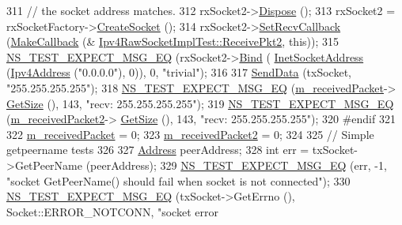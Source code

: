 \begin{DoxyCode}
311   \textcolor{comment}{// the socket address matches.}
312   rxSocket2->\hyperlink{classns3_1_1Object_aa90ae598863f6c251cdab3c3722afdaf}{Dispose} ();
313   rxSocket2 = rxSocketFactory->\hyperlink{classns3_1_1SocketFactory_a97351e6e7860503a4912042530449f62}{CreateSocket} ();
314   rxSocket2->\hyperlink{classns3_1_1Socket_a243f7835ef1a85f9270fd3577e3a40da}{SetRecvCallback} (\hyperlink{group__makecallbackmemptr_ga9376283685aa99d204048d6a4b7610a4}{MakeCallback} (&
      \hyperlink{classIpv4RawSocketImplTest_aa8913acb80b6b4644629066bfa04222d}{Ipv4RawSocketImplTest::ReceivePkt2}, \textcolor{keyword}{this}));
315   \hyperlink{group__testing_ga7304ba46a28d8cf08dfdfd6499cf7068}{NS\_TEST\_EXPECT\_MSG\_EQ} (rxSocket2->\hyperlink{classns3_1_1Socket_ada93439a43de2028b5a8fc6621dad482}{Bind} (
      \hyperlink{classns3_1_1InetSocketAddress}{InetSocketAddress} (\hyperlink{classns3_1_1Ipv4Address}{Ipv4Address} (\textcolor{stringliteral}{"0.0.0.0"}), 0)), 0, \textcolor{stringliteral}{"trivial"});
316 
317   \hyperlink{classIpv4RawSocketImplTest_a62c6104203d0fb2f7688ac216f0d5218}{SendData} (txSocket, \textcolor{stringliteral}{"255.255.255.255"});
318   \hyperlink{group__testing_ga7304ba46a28d8cf08dfdfd6499cf7068}{NS\_TEST\_EXPECT\_MSG\_EQ} (\hyperlink{classIpv4RawSocketImplTest_a38dee32030c77d03c740508d0a68bd22}{m\_receivedPacket}->
      \hyperlink{classns3_1_1Packet_a462855c9929954d4301a4edfe55f4f1c}{GetSize} (), 143, \textcolor{stringliteral}{"recv: 255.255.255.255"});
319   \hyperlink{group__testing_ga7304ba46a28d8cf08dfdfd6499cf7068}{NS\_TEST\_EXPECT\_MSG\_EQ} (\hyperlink{classIpv4RawSocketImplTest_a52607bc760ccb25a084978830b95d162}{m\_receivedPacket2}->
      \hyperlink{classns3_1_1Packet_a462855c9929954d4301a4edfe55f4f1c}{GetSize} (), 143, \textcolor{stringliteral}{"recv: 255.255.255.255"});
320 \textcolor{preprocessor}{#endif}
321 
322   \hyperlink{classIpv4RawSocketImplTest_a38dee32030c77d03c740508d0a68bd22}{m\_receivedPacket} = 0;
323   \hyperlink{classIpv4RawSocketImplTest_a52607bc760ccb25a084978830b95d162}{m\_receivedPacket2} = 0;
324 
325   \textcolor{comment}{// Simple getpeername tests}
326 
327   \hyperlink{classns3_1_1Address}{Address} peerAddress;
328   \textcolor{keywordtype}{int} err = txSocket->GetPeerName (peerAddress);
329   \hyperlink{group__testing_ga7304ba46a28d8cf08dfdfd6499cf7068}{NS\_TEST\_EXPECT\_MSG\_EQ} (err, -1, \textcolor{stringliteral}{"socket GetPeerName() should fail when socket is not
       connected"});
330   \hyperlink{group__testing_ga7304ba46a28d8cf08dfdfd6499cf7068}{NS\_TEST\_EXPECT\_MSG\_EQ} (txSocket->GetErrno (), Socket::ERROR\_NOTCONN, \textcolor{stringliteral}{"socket error
}
\end{DoxyCode}
